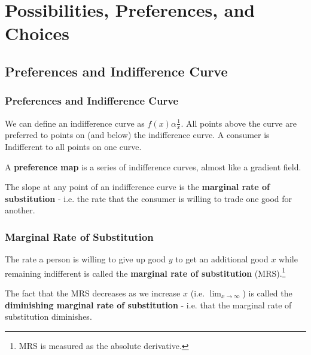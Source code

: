         \chapter{Possibilities, Preferences, and Choices} %
        \label{cha:possibilities_preferences_and_choices}
            \section{Preferences and Indifference Curve} %
            \label{sec:preferences_and_indifference_curve}
                \subsection{Preferences and Indifference Curve} %
                \label{sub:preferences_and_indifference_curve}
                    We can define an indifference curve as $f(x) \alpha \frac{1}{x}$.
                    All points above the curve are preferred to points on (and below) the indifference curve.
                    A consumer is Indifferent to all points on one curve.

                    A \textbf{preference map} is a series of indifference curves, almost like a gradient field.

                    The slope at any point of an indifference curve is the \textbf{marginal rate of substitution} - i.e. the rate that the consumer is willing to trade one good for another.
                \subsection{Marginal Rate of Substitution} %
                \label{sub:marginal_rate_of_substitution}
                    The rate a person is willing to give up good $y$ to get an additional good $x$ while remaining indifferent is called the \textbf{marginal rate of substitution} (MRS).\footnote{MRS is measured as the absolute derivative.}

                    The fact that the MRS decreases as we increase $x$ (i.e. $\lim_{x \to \infty}$) is called the \textbf{diminishing marginal rate of substitution} - i.e. that the marginal rate of substitution diminishes.
